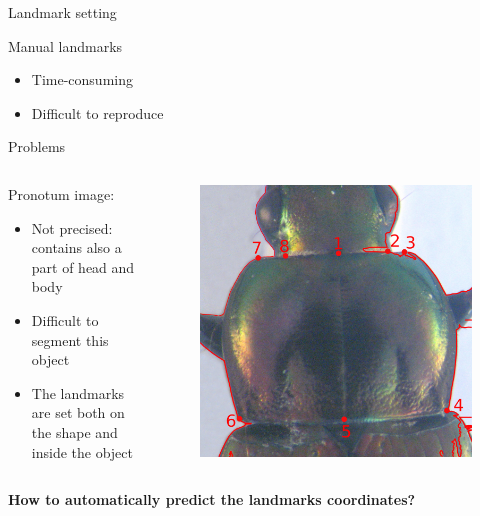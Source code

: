 \documentclass[10pt,svgnames]{beamer}
\begin{document}

\begin{frame}{Landmark setting}{}
	\begin{block}{Manual landmarks}		
		\begin{itemize}
	  				\item Time-consuming
					\item Difficult to reproduce
  				\end{itemize}
	\end{block}
	\begin{block}{Problems}
		\begin{columns}
			\begin{column}{0.65\textwidth}
				Pronotum image:
				\begin{itemize}
  					\item Not precised: contains also a part of head and body
		  			\item Difficult to segment this object
  					\item The landmarks are set both on the shape and inside the object
  				\end{itemize}
			\end{column}
			\begin{column}{0.3\textwidth}
				\begin{figure}[htbp]
					\centering
					\includegraphics[scale=.040]{images/prono_003_lm2}
				\end{figure}
			\end{column}
		\end{columns}		
	\end{block}
	\pause
	\begin{center}	
		\textbf{How to {\color{red}automatically} predict the {\color{red}landmarks coordinates}?}	
	\end{center}
  	
  
	
\end{frame}
\end{document}
